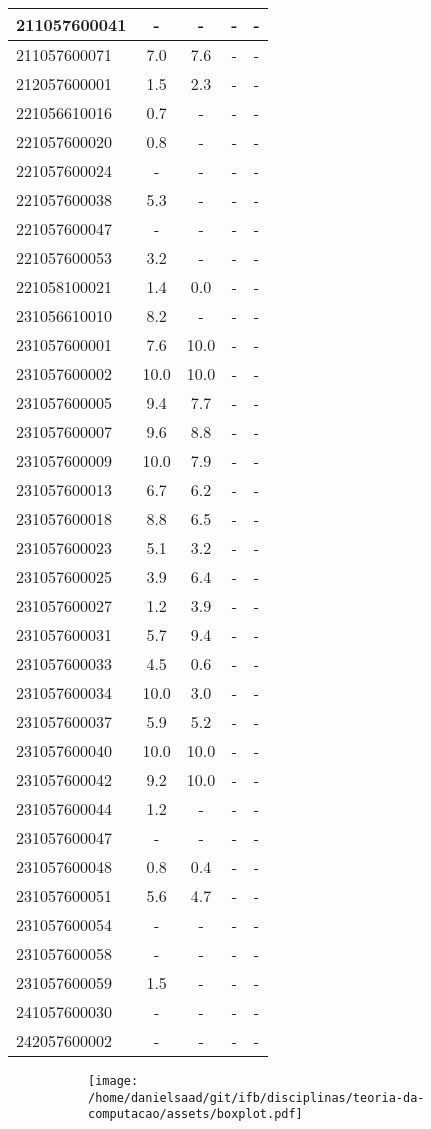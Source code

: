 \documentclass{article}
\begin{document}
\begin{longtable}{|l|c|c|c|c|}
211057600041 & - & - & - & -\\\hline
211057600071 & 7.0 & 7.6 & - & -\\\hline
212057600001 & 1.5 & 2.3 & - & -\\\hline
221056610016 & 0.7 & - & - & -\\\hline
221057600020 & 0.8 & - & - & -\\\hline
221057600024 & - & - & - & -\\\hline
221057600038 & 5.3 & - & - & -\\\hline
221057600047 & - & - & - & -\\\hline
221057600053 & 3.2 & - & - & -\\\hline
221058100021 & 1.4 & 0.0 & - & -\\\hline
231056610010 & 8.2 & - & - & -\\\hline
231057600001 & 7.6 & 10.0 & - & -\\\hline
231057600002 & 10.0 & 10.0 & - & -\\\hline
231057600005 & 9.4 & 7.7 & - & -\\\hline
231057600007 & 9.6 & 8.8 & - & -\\\hline
231057600009 & 10.0 & 7.9 & - & -\\\hline
231057600013 & 6.7 & 6.2 & - & -\\\hline
231057600018 & 8.8 & 6.5 & - & -\\\hline
231057600023 & 5.1 & 3.2 & - & -\\\hline
231057600025 & 3.9 & 6.4 & - & -\\\hline
231057600027 & 1.2 & 3.9 & - & -\\\hline
231057600031 & 5.7 & 9.4 & - & -\\\hline
231057600033 & 4.5 & 0.6 & - & -\\\hline
231057600034 & 10.0 & 3.0 & - & -\\\hline
231057600037 & 5.9 & 5.2 & - & -\\\hline
231057600040 & 10.0 & 10.0 & - & -\\\hline
231057600042 & 9.2 & 10.0 & - & -\\\hline
231057600044 & 1.2 & - & - & -\\\hline
231057600047 & - & - & - & -\\\hline
231057600048 & 0.8 & 0.4 & - & -\\\hline
231057600051 & 5.6 & 4.7 & - & -\\\hline
231057600054 & - & - & - & -\\\hline
231057600058 & - & - & - & -\\\hline
231057600059 & 1.5 & - & - & -\\\hline
241057600030 & - & - & - & -\\\hline
242057600002 & - & - & - & -\\\hline
\end{longtable}
\begin{figure}[h!]
\centering\begin{subfigure}
        \centering
        \texttt{[image: /home/danielsaad/git/ifb/disciplinas/teoria-da-computacao/assets/boxplot.pdf]}
    \end{subfigure}\end{figure}
\end{document}
